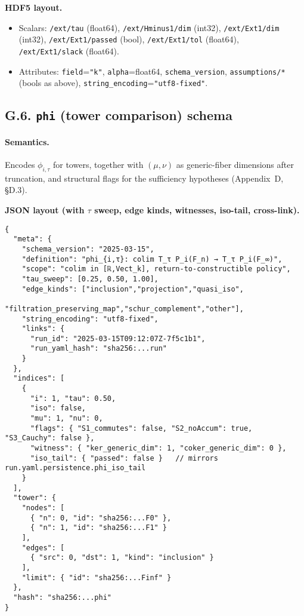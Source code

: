 \documentclass[11pt]{article}
\numberwithin{equation}{section}
\theoremstyle{definition}
\begin{document}
\noindent\textbf{HDF5 layout.}
\begin{itemize}
\item Scalars: \texttt{/ext/tau} (float64), \texttt{/ext/Hminus1/dim} (int32),
\texttt{/ext/Ext1/dim} (int32), \texttt{/ext/Ext1/passed} (bool), \texttt{/ext/Ext1/tol} (float64),
\texttt{/ext/Ext1/slack} (float64).
\item Attributes: \texttt{field}=\texttt{"k"}, \texttt{alpha}=float64, \texttt{schema\_version},
\texttt{assumptions/*} (bools as above), \texttt{string\_encoding}=\texttt{"utf8-fixed"}.
\end{itemize}

\subsection*{G.6. \texttt{phi} (tower comparison) schema}
\paragraph{Semantics.} Encodes \(\phi_{i,\tau}\) for towers, together with \((\mu,\nu)\) as generic-fiber
dimensions after truncation, and structural flags for the sufficiency hypotheses (Appendix~D, §D.3).

\noindent\textbf{JSON layout (with \(\tau\) sweep, edge kinds, witnesses, iso-tail, cross-link).}
\begin{verbatim}
{
  "meta": {
    "schema_version": "2025-03-15",
    "definition": "phi_{i,τ}: colim T_τ P_i(F_n) → T_τ P_i(F_∞)",
    "scope": "colim in [ℝ,Vect_k], return-to-constructible policy",
    "tau_sweep": [0.25, 0.50, 1.00],
    "edge_kinds": ["inclusion","projection","quasi_iso",
                   "filtration_preserving_map","schur_complement","other"],
    "string_encoding": "utf8-fixed",
    "links": {
      "run_id": "2025-03-15T09:12:07Z-7f5c1b1",
      "run_yaml_hash": "sha256:...run"
    }
  },
  "indices": [
    {
      "i": 1, "tau": 0.50,
      "iso": false,
      "mu": 1, "nu": 0,
      "flags": { "S1_commutes": false, "S2_noAccum": true, "S3_Cauchy": false },
      "witness": { "ker_generic_dim": 1, "coker_generic_dim": 0 },
      "iso_tail": { "passed": false }   // mirrors run.yaml.persistence.phi_iso_tail
    }
  ],
  "tower": {
    "nodes": [
      { "n": 0, "id": "sha256:...F0" },
      { "n": 1, "id": "sha256:...F1" }
    ],
    "edges": [
      { "src": 0, "dst": 1, "kind": "inclusion" }
    ],
    "limit": { "id": "sha256:...Finf" }
  },
  "hash": "sha256:...phi"
}
\end{verbatim}
\end{document}
